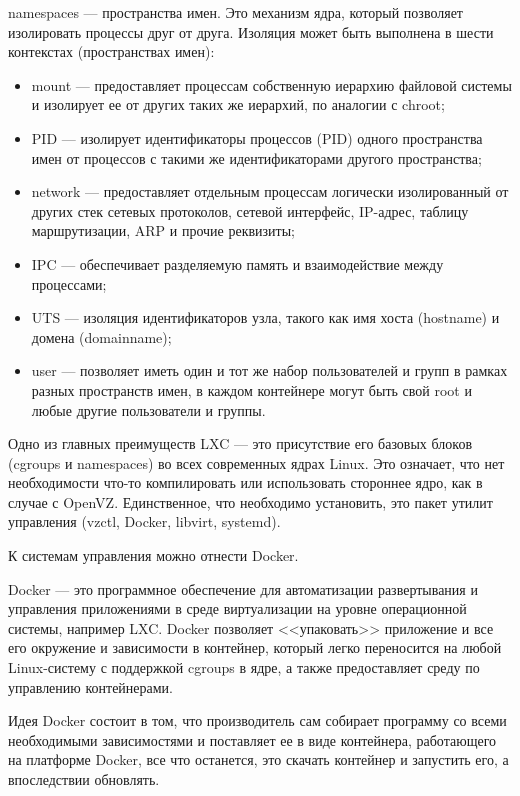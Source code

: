 namespaces --- пространства имен.
Это механизм ядра, который позволяет изолировать процессы друг от друга.
Изоляция может быть выполнена в шести контекстах (пространствах имен):
\begin{itemize}
  \item mount --- предоставляет процессам собственную иерархию файловой системы и изолирует ее от других таких же иерархий, по аналогии с chroot;
  \item PID --- изолирует идентификаторы процессов (PID) одного пространства имен от процессов с такими же идентификаторами другого пространства;
  \item network --- предоставляет отдельным процессам логически изолированный от других стек сетевых протоколов, сетевой интерфейс, IP-адрес, таблицу маршрутизации, ARP и прочие реквизиты;
  \item IPC --- обеспечивает разделяемую память и взаимодействие между процессами;
  \item UTS --- изоляция идентификаторов узла, такого как имя хоста (hostname) и домена (domainname);
  \item user --- позволяет иметь один и тот же набор пользователей и групп в рамках разных пространств имен, в каждом контейнере могут быть свой root и любые другие пользователи и группы.
\end{itemize}

Одно из главных преимуществ LXC --- это присутствие его базовых блоков (cgroups и namespaces) во всех современных ядрах Linux.
Это означает, что нет необходимости что-то компилировать или использовать стороннее ядро, как в случае с OpenVZ.
Единственное, что необходимо установить, это пакет утилит управления (vzctl, Docker, libvirt, systemd).

К системам управления можно отнести Docker.

Docker --- это программное обеспечение для автоматизации развертывания и управления приложениями в среде виртуализации на уровне операционной системы, например LXC.
Docker позволяет <<упаковать>> приложение и все его окружение и зависимости в контейнер, который легко переносится на любой Linux-систему с поддержкой cgroups в ядре, а также предоставляет среду по управлению контейнерами.

Идея Docker состоит в том, что производитель сам собирает программу со всеми необходимыми зависимостями и поставляет ее в виде контейнера, работающего на платформе Docker, все что останется, это скачать контейнер и запустить его, а впоследствии обновлять.


